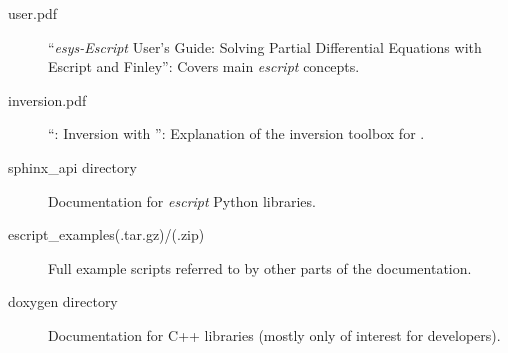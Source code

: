 \begin{center}
\begin{description}
 \item[user.pdf]  ``\emph{esys-Escript} User's Guide: Solving Partial Differential Equations with Escript and Finley'':
 Covers main \emph{escript} concepts.
 
 \item[inversion.pdf] ``\downunder: Inversion with \escript'':
 Explanation of the inversion toolbox for \escript.
 
 \item[sphinx_api directory] Documentation for \emph{escript} Python libraries.
 
 \item[escript_examples(.tar.gz)/(.zip)] Full example scripts referred to by other parts of the documentation.
 
 \item[doxygen directory] Documentation for C++ libraries (mostly only of interest for developers).
  
\end{description}




\end{center}
\vfill
\pagebreak